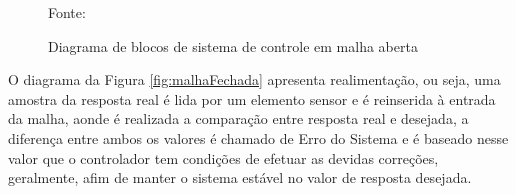 \begin{figure}[!htb]
\centering
\caption{ Diagrama de blocos de sistema de controle em malha aberta}
\label{fig:malhaAberta}

{\small Fonte: \cite{Ogata}}
\end{figure}

O diagrama da Figura \ref{fig:malhaFechada} 
apresenta realimentação, ou seja, 
uma amostra da resposta real é lida por um elemento sensor e é 
reinserida à entrada da malha, 
aonde é realizada a comparação entre resposta real e desejada, 
a diferença entre ambos os valores é chamado de Erro do Sistema e é 
baseado nesse valor que o controlador tem condições de efetuar as 
devidas correções, geralmente, 
afim de manter o sistema estável no valor de resposta desejada.

